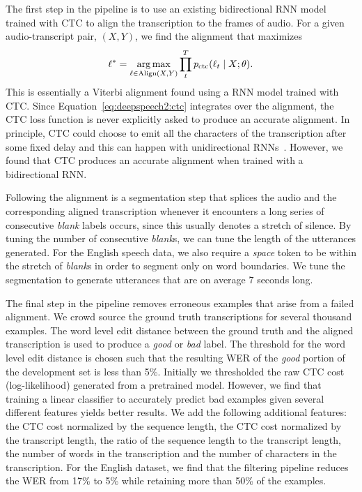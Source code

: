 The first step in the pipeline is to use an existing bidirectional RNN model
trained with CTC to align the transcription to the frames of audio. For a given
audio-transcript pair, $(X, Y)$, we find the alignment that maximizes
\begin{equation*}
\ell^* = \operatorname*{arg\,max}_{\ell \in \text{Align}(X,Y)} \prod_t^T p_{\text{ctc}}(\ell_t \mid X; \theta).
\end{equation*}
This is essentially a Viterbi alignment found using a RNN model trained with
CTC. Since Equation~\ref{eq:deepspeech2:ctc} integrates over the alignment, the
CTC loss function is never explicitly asked to produce an accurate alignment.
In principle, CTC could choose to emit all the characters of the transcription
after some fixed delay and this can happen with unidirectional
RNNs~\cite{sak2015}. However, we found that CTC produces an accurate alignment
when trained with a bidirectional RNN.

Following the alignment is a segmentation step that splices the audio and the
corresponding aligned transcription whenever it encounters a long series of
consecutive \emph{blank} labels occurs, since this usually denotes a stretch of
silence. By tuning the number of consecutive \emph{blank}s, we can tune the
length of the utterances generated. For the English speech data, we also
require a \emph{space} token to be within the stretch of \emph{blank}s in order
to segment only on word boundaries. We tune the segmentation to generate
utterances that are on average 7 seconds long.

The final step in the pipeline removes erroneous examples that arise from a
failed alignment. We crowd source the ground truth transcriptions for several
thousand examples. The word level edit distance between the ground truth and
the aligned transcription is used to produce a \emph{good} or \emph{bad} label.
The threshold for the word level edit distance is chosen such that the
resulting WER of the \emph{good} portion of the development set is less than
5\%. Initially we thresholded the raw CTC cost (log-likelihood) generated from
a pretrained model. However, we find that training a linear classifier to
accurately predict bad examples given several different features yields better
results. We add the following additional features: the CTC cost normalized by
the sequence length, the CTC cost normalized by the transcript length, the
ratio of the sequence length to the transcript length, the number of words in
the transcription and the number of characters in the transcription. For the
English dataset, we find that the filtering pipeline reduces the WER from 17\%
to 5\% while retaining more than 50\% of the examples.

